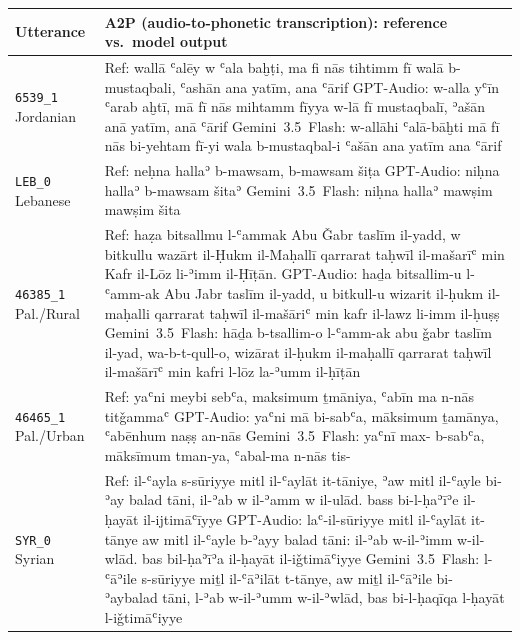 \begin{table}[t]
\centering
\small
\begin{tabular}{p{} p{}}
\toprule
\textbf{Utterance} & \textbf{A2P (audio-to-phonetic transcription): reference vs.\ model output} \\
\midrule
\texttt{6539\_1} \newline \scriptsize Jordanian & Ref: wallā ʿalēy w ʿala baḫṭi, ma fi nās tihtimm fī walā b-mustaqbali, ʿashān ana yatīm, ana ʿārif \newline GPT-Audio: w-alla yʿīn ʿarab aḫtī, mā fī nās mihtamm fīyya w-lā fī mustaqbalī, ʾašān anā yatīm, anā ʿārif \newline Gemini~3.5~Flash: w-allāhi ʿalā-bāḫti mā fī nās bi-yehtam fī-yi wala b-mustaqbal-i ʿašān ana yatīm ana ʿārif \\
\addlinespace[4pt]
\texttt{LEB\_0} \newline \scriptsize Lebanese & Ref: neḥna hallaʾ b-mawsam, b-mawsam šiṭa \newline GPT-Audio: niḥna hallaʾ b-mawsam šitaʾ \newline Gemini~3.5~Flash: niḥna hallaʾ mawṣim mawṣim šita \\
\addlinespace[4pt]
\texttt{46385\_1} \newline \scriptsize Pal./Rural & Ref: haẓa bitsallmu l-ʿammak Abu Ǧabr taslīm il-yadd, w bitkullu wazārt il-Ḥukm il-Maḥallī qarrarat taḥwīl il-mašarīʿ min Kafr il-Lōz li-ʾimm il-Ḥīṭān. \newline GPT-Audio: haḏa bitsallim-u l-ʿamm-ak Abu Jabr taslīm il-yadd, u bitkull-u wizarit il-ḥukm il-maḥalli qarrarat taḥwīl il-mašāriʿ min kafr il-lawz li-imm il-ḥuṣṣ \newline Gemini~3.5~Flash: hāḏa b-tsallim-o l-ʿamm-ak abu ǧabr taslīm il-yad, wa-b-t-qull-o, wizārat il-ḥukm il-maḥallī qarrarat taḥwīl il-mašārīʿ min kafri l-lōz la-ʾumm il-ḥīṭān \\
\addlinespace[4pt]
\texttt{46465\_1} \newline \scriptsize Pal./Urban & Ref: yaʿni meybi sebʿa, maksimum ṯmāniya, ʿabīn ma n-nās titǧammaʿ \newline GPT-Audio: yaʿni mā bi-sabʿa, māksimum ṯamānya, ʿabēnhum naṣṣ an-nās \newline Gemini~3.5~Flash: yaʿnī max- b-sabʿa, māksīmum tman-ya, ʿabal-ma n-nās tis- \\
\addlinespace[4pt]
\texttt{SYR\_0} \newline \scriptsize Syrian & Ref: il-ʿayla s-sūriyye mitl il-ʿaylāt it-tāniye, ʾaw mitl il-ʿayle bi-ʾay balad tāni, il-ʾab w il-ʾamm w il-ulād. bass bi-l-ḥaʾīʾe il-ḥayāt il-ijtimāʿīyye \newline GPT-Audio: laʿ-il-sūriyye mitl il-ʿaylāt it-tānye aw mitl il-ʿayle b-ʾayy balad tāni: il-ʾab w-il-ʾimm w-il-wlād. bas bil-ḥaʾīʾa il-ḥayāt il-iǧtimāʿiyye \newline Gemini~3.5~Flash: l-ʿāʾile s-sūriyye miṯl il-ʿāʾilāt t-tānye, aw miṯl il-ʿāʾile bi-ʾaybalad tāni, l-ʾab w-il-ʾumm w-il-ʾwlād, bas bi-l-ḥaqīqa l-ḥayāt l-iǧtimāʿiyye \\

\end{tabular}
\end{table}
